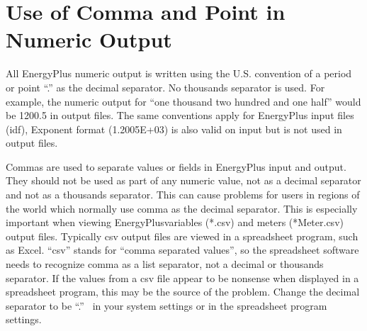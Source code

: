 \section{Use of Comma and Point in Numeric Output}\label{use-of-comma-and-point-in-numeric-output}

All EnergyPlus numeric output is written using the U.S. convention of a period or point ``.'' as the decimal separator. No thousands separator is used. For example, the numeric output for ``one thousand two hundred and one half'' would be 1200.5 in output files. The same conventions apply for EnergyPlus input files (idf), Exponent format (1.2005E+03) is also valid on input but is not used in output files.

Commas are used to separate values or fields in EnergyPlus input and output. They should not be used as part of any numeric value, not as a decimal separator and not as a thousands separator. This can cause problems for users in regions of the world which normally use comma as the decimal separator. This is especially important when viewing EnergyPlusvariables (*.csv) and meters (*Meter.csv) output files. Typically csv output files are viewed in a spreadsheet program, such as Excel. ``csv'' stands for ``comma separated values'', so the spreadsheet software needs to recognize comma as a list separator, not a decimal or thousands separator. If the values from a csv file appear to be nonsense when displayed in a spreadsheet program, this may be the source of the problem. Change the decimal separator to be ``.''~ in your system settings or in the spreadsheet program settings.
